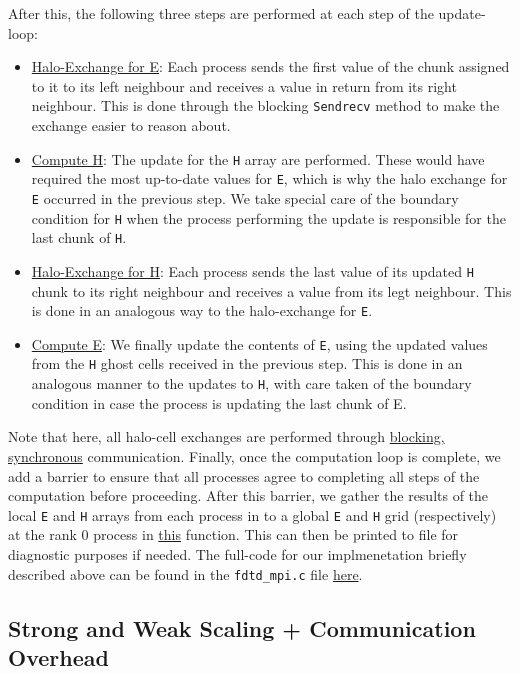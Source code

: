 \documentclass[a4paper,10pt]{article}
\begin{document}
After this, the following three steps are performed at each step of the update-loop:
\begin{itemize}
\item \underline{Halo-Exchange for E}: Each process sends the first value of the chunk assigned to it to its left neighbour and receives a value in return from its right neighbour. This is done through the blocking \verb|Sendrecv| method to make the exchange easier to reason about. 
\item \underline{Compute H}: The update for the \verb|H| array are performed. These would have required the most up-to-date values for \verb|E|, which is why the halo exchange for \verb|E| occurred in the previous step. We take special care of the boundary condition for \verb|H| when the process performing the update is responsible for the last chunk of \verb|H|.
\item \underline{Halo-Exchange for H}: Each process sends the last value of its updated \verb|H| chunk to its right neighbour and receives a value from its legt neighbour. This is done in an analogous way to the halo-exchange for \verb|E|. 
\item \underline{Compute E}: We finally update the contents of \verb|E|, using the updated values from the \verb|H| ghost cells received in the previous step. This is done in an analogous manner to the updates to \verb|H|, with care taken of the boundary condition in case the process is updating the last chunk of E. 
\end{itemize}

Note that here, all halo-cell exchanges are performed through \underline{blocking, synchronous} communication. Finally, once the computation loop is complete, we add a barrier to ensure that all processes agree to completing all steps of the computation before proceeding. After this barrier, we gather the results of the local \verb|E| and \verb|H| arrays from each process in to a global \verb|E| and \verb|H| grid (respectively) at the rank 0 process in \href{https://github.com/paulmyr/DD2356-MethodsHPC/blob/master/5_project/3_mpi/fdtd_mpi.c#L108}{this} function. This can then be printed to file for diagnostic purposes if needed. The full-code for our implmenetation briefly described above can be found in the \verb|fdtd_mpi.c| file \href{https://github.com/paulmyr/DD2356-MethodsHPC/blob/master/5_project/3_mpi/fdtd_mpi.c}{here}.

\subsection{Strong and Weak Scaling + Communication Overhead}
\end{document}
